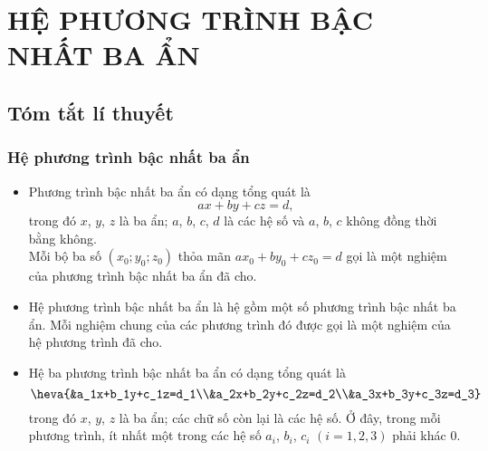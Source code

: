 \section{HỆ PHƯƠNG TRÌNH BẬC NHẤT BA ẨN}
\subsection{Tóm tắt lí thuyết}
\subsubsection{Hệ phương trình bậc nhất ba ẩn}
\begin{tomtat}
	\begin{itemize}
		\item Phương trình bậc nhất ba ẩn có dạng tổng quát là 
		\[ax+by+cz=d,\]
		trong đó $x$, $y$, $z$ là ba ẩn; $a$, $b$, $c$, $d$ là các hệ số và $a$, $b$, $c$ không đồng thời bằng không.\\
		Mỗi bộ ba số $(x_0;y_0;z_0)$ thỏa mãn $ax_0+by_0+cz_0=d$ gọi là một nghiệm của phương trình bậc nhất ba ẩn đã cho.
		\item Hệ phương trình bậc nhất ba ẩn là hệ gồm một số phương trình bậc nhất ba ẩn. Mỗi nghiệm chung của các phương trình đó được gọi là một nghiệm của hệ phương trình đã cho.
		\item Hệ ba phương trình bậc nhất ba ẩn có dạng tổng quát là
		 \[\heva{&a_1x+b_1y+c_1z=d_1\\&a_2x+b_2y+c_2z=d_2\\&a_3x+b_3y+c_3z=d_3}\]
		 trong đó $x$, $y$, $z$ là ba ẩn; các chữ số còn lại là các hệ số. Ở đây, trong mỗi phương trình, ít nhất một trong các hệ số $a_i$, $b_i$, $c_i$ $(i=1,2,3)$ phải khác $0$.
	\end{itemize}
\end{tomtat}
